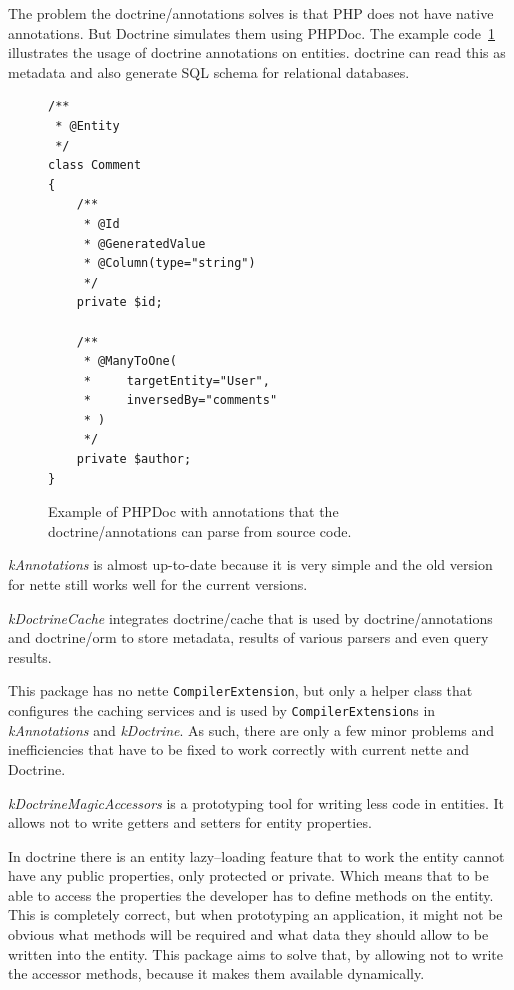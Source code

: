 The problem the doctrine/annotations solves is that PHP does not have native annotations. But Doctrine simulates them using PHPDoc. The example code~\ref{fig:php:annotations-example} illustrates the usage of \gls{doctrine} annotations on entities. \gls{doctrine} can read this as metadata and also generate SQL schema for relational databases.

\begin{figure} \label{fig:php:annotations-example}
\begin{lstlisting}
/**
 * @Entity
 */
class Comment
{
    /**
     * @Id
     * @GeneratedValue
     * @Column(type="string")
     */
    private $id;

    /**
     * @ManyToOne(
     *     targetEntity="User",
     *     inversedBy="comments"
     * )
     */
    private $author;
}
\end{lstlisting}
\caption{Example of PHPDoc with annotations that the doctrine/annotations can parse from source code.}
\end{figure}

\textit{\gls{kAnnotations}} is almost up-to-date because it is very simple and the old version for \gls{nette} still works well for the current versions.

 \label{sec:state:doctrine-cache}

\textit{\gls{kDoctrineCache}} integrates doctrine/cache that is used by doctrine/annotations and doctrine/orm to store metadata, results of various parsers and even query results.

This package has no \gls{nette} \lstinline{CompilerExtension}, but only a helper class that configures the caching services and is used by \lstinline{CompilerExtension}s in \textit{\gls{kAnnotations}} and \textit{\gls{kDoctrine}}. As such, there are only a few minor problems and inefficiencies that have to be fixed to work correctly with current \gls{nette} and Doctrine.

 \label{sec:state:doctrine-magic-accessors}

\textit{\gls{kDoctrineMagicAccessors}} is a prototyping tool for writing less code in entities. It allows not to write getters and setters for entity properties.

In \gls{doctrine} there is an entity lazy--loading feature that to work the entity cannot have any public properties, only protected or private. Which means that to be able to access the properties the developer has to define methods on the entity. This is completely correct, but when prototyping an application, it might not be obvious what methods will be required and what data they should allow to be written into the entity. This package aims to solve that, by allowing not to write the accessor methods, because it makes them available dynamically.

